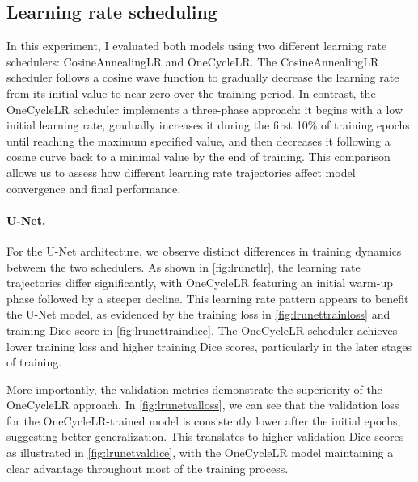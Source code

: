 \documentclass[twocolumn,a4paper]{article}
\begin{document}
\subsection{Learning rate scheduling}
In this experiment, I evaluated both models using two different learning rate schedulers: CosineAnnealingLR and OneCycleLR. The CosineAnnealingLR scheduler follows a cosine wave function to gradually decrease the learning rate from its initial value to near-zero over the training period. In contrast, the OneCycleLR scheduler implements a three-phase approach: it begins with a low initial learning rate, gradually increases it during the first 10\% of training epochs until reaching the maximum specified value, and then decreases it following a cosine curve back to a minimal value by the end of training. This comparison allows us to assess how different learning rate trajectories affect model convergence and final performance.

\paragraph{U-Net.} For the U-Net architecture, we observe distinct differences in training dynamics between the two schedulers. As shown in \autoref{fig:lrunetlr}, the learning rate trajectories differ significantly, with OneCycleLR featuring an initial warm-up phase followed by a steeper decline. This learning rate pattern appears to benefit the U-Net model, as evidenced by the training loss in \autoref{fig:lrunettrainloss} and training Dice score in \autoref{fig:lrunettraindice}. The OneCycleLR scheduler achieves lower training loss and higher training Dice scores, particularly in the later stages of training.

More importantly, the validation metrics demonstrate the superiority of the OneCycleLR approach. In \autoref{fig:lrunetvalloss}, we can see that the validation loss for the OneCycleLR-trained model is consistently lower after the initial epochs, suggesting better generalization. This translates to higher validation Dice scores as illustrated in \autoref{fig:lrunetvaldice}, with the OneCycleLR model maintaining a clear advantage throughout most of the training process.
\end{document}
